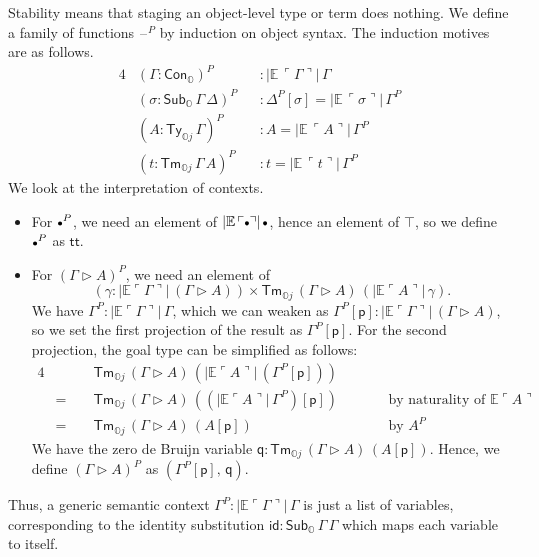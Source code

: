 \documentclass[acmsmall]{acmart}
\newcommand{\msf}[1]{\mathsf{#1}}
\newcommand{\mbb}[1]{\mathbb{#1}}
\newcommand{\ext}{\triangleright}
\newcommand{\mbbo}{\mbb{O}}
\newcommand{\Ty}{\msf{Ty}}
\newcommand{\Tm}{\msf{Tm}}
\newcommand{\Cono}{\msf{Con}_{\mbbo}}
\newcommand{\Subo}{\msf{Sub}_{\mbbo}}
\newcommand{\p}{\mathsf{p}}
\newcommand{\q}{\mathsf{q}}
\renewcommand{\tt}{\msf{tt}}
\newcommand{\emptycon}{\scaleobj{.75}\bullet}
\newcommand{\id}{\msf{id}}
\newcommand{\blank}{{\mathord{\hspace{1pt}\text{--}\hspace{1pt}}}}
\newcommand{\emb}[1]{\ulcorner#1\urcorner}
\newcommand{\ev}{\mbb{E}}
\theoremstyle{remark}
\begin{document}
Stability means that staging an object-level type or term does nothing. We
define a family of functions $\blank^P$ by induction on object syntax. The
induction motives are as follows.
\begin{alignat*}{4}
  & (\Gamma : \Cono)^P                    &&: |\ev\,\emb{\Gamma}|\,\Gamma\\
  & (\sigma : \Subo\,\Gamma\,\Delta)^P    &&: \Delta^P[\sigma] = |\ev\,\emb{\sigma}|\,\Gamma^P\\
  & (A      : \Ty_{\mbbo j}\,\Gamma)^P      &&: A = |\ev\,\emb{A}|\,\Gamma^P\\
  & (t      : \Tm_{\mbbo j}\,\Gamma\,A)^P   &&: t = |\ev\,\emb{t}|\,\Gamma^P
\end{alignat*}
We look at the interpretation of contexts.
\begin{itemize}
\item  For $\emptycon^P$, we need an element of $|\ev\,\emb{\emptycon}|\,\emptycon$, hence
  an element of $\top$, so we define $\emptycon^P$ as $\tt$.
\item
  For $(\Gamma \ext A)^P$, we need an element of
    \[(\gamma : |\ev{\emb{\Gamma}}|\,(\Gamma\ext A)) \times \Tm_{\mbbo j}\,(\Gamma \ext A)\,(|\ev\emb{A}|\,\gamma).\]
  We have $\Gamma^P : |\ev{\emb{\Gamma}}|\,\Gamma$, which we can weaken as
  $\Gamma^P[\p] : |\ev{\emb{\Gamma}}|\,(\Gamma \ext A)$, so we set the first
  projection of the result as $\Gamma^P[\p]$. For the second projection, the
  goal type can be simplified as follows:
  \begin{alignat*}{4}
    &       &&\Tm_{\mbbo j}\,(\Gamma \ext A)\,(|\ev\emb{A}|\,(\Gamma^P[\p])) && \\
    & =\,\, &&\Tm_{\mbbo j}\,(\Gamma \ext A)\,((|\ev\emb{A}|\,\Gamma^P)[\p]) &&\hspace{2em} \text{by naturality of $\ev\emb{A}$}\\
    & =\,\, &&\Tm_{\mbbo j}\,(\Gamma \ext A)\,(A[\p])                        &&\hspace{2em} \text{by $A^P$}
  \end{alignat*}
  We have the zero de Bruijn variable $\q : \Tm_{\mbbo j}\,(\Gamma \ext
  A)\,(A[\p])$.  Hence, we define $(\Gamma \ext A)^P$ as $(\Gamma^P[\p],\,\q)$.
\end{itemize}

Thus, a generic semantic context $\Gamma^P : |\ev\emb{\Gamma}|\,\Gamma$ is just
a list of variables, corresponding to the identity substitution $\id :
\Subo\,\Gamma\,\Gamma$ which maps each variable to itself.
\end{document}
